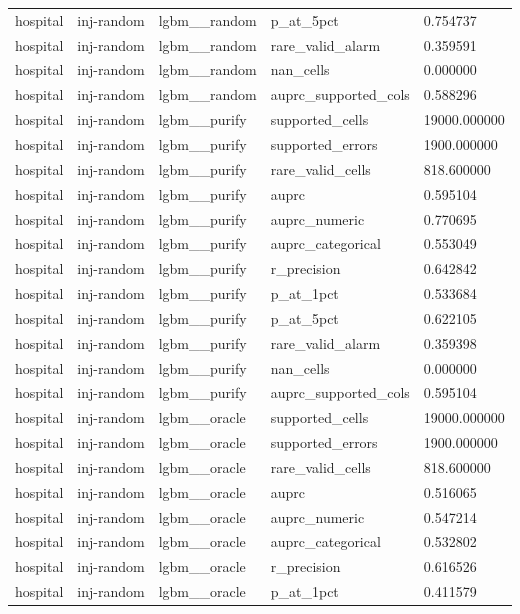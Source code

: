 \begin{tabular}{lllll}
hospital & inj-random & lgbm\_\_random & p\_at\_5pct & 0.754737 \\
hospital & inj-random & lgbm\_\_random & rare\_valid\_alarm & 0.359591 \\
hospital & inj-random & lgbm\_\_random & nan\_cells & 0.000000 \\
hospital & inj-random & lgbm\_\_random & auprc\_supported\_cols & 0.588296 \\
hospital & inj-random & lgbm\_\_purify & supported\_cells & 19000.000000 \\
hospital & inj-random & lgbm\_\_purify & supported\_errors & 1900.000000 \\
hospital & inj-random & lgbm\_\_purify & rare\_valid\_cells & 818.600000 \\
hospital & inj-random & lgbm\_\_purify & auprc & 0.595104 \\
hospital & inj-random & lgbm\_\_purify & auprc\_numeric & 0.770695 \\
hospital & inj-random & lgbm\_\_purify & auprc\_categorical & 0.553049 \\
hospital & inj-random & lgbm\_\_purify & r\_precision & 0.642842 \\
hospital & inj-random & lgbm\_\_purify & p\_at\_1pct & 0.533684 \\
hospital & inj-random & lgbm\_\_purify & p\_at\_5pct & 0.622105 \\
hospital & inj-random & lgbm\_\_purify & rare\_valid\_alarm & 0.359398 \\
hospital & inj-random & lgbm\_\_purify & nan\_cells & 0.000000 \\
hospital & inj-random & lgbm\_\_purify & auprc\_supported\_cols & 0.595104 \\
hospital & inj-random & lgbm\_\_oracle & supported\_cells & 19000.000000 \\
hospital & inj-random & lgbm\_\_oracle & supported\_errors & 1900.000000 \\
hospital & inj-random & lgbm\_\_oracle & rare\_valid\_cells & 818.600000 \\
hospital & inj-random & lgbm\_\_oracle & auprc & 0.516065 \\
hospital & inj-random & lgbm\_\_oracle & auprc\_numeric & 0.547214 \\
hospital & inj-random & lgbm\_\_oracle & auprc\_categorical & 0.532802 \\
hospital & inj-random & lgbm\_\_oracle & r\_precision & 0.616526 \\
hospital & inj-random & lgbm\_\_oracle & p\_at\_1pct & 0.411579 \\

\end{tabular}
